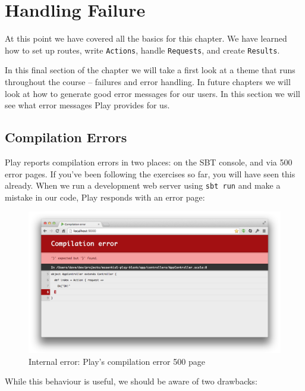 \documentclass[oneside,11pt,a4paper,]{book}
\begin{document}
\section{Handling Failure}\label{handling-failure}

At this point we have covered all the basics for this chapter. We have
learned how to set up routes, write \texttt{Actions}, handle
\texttt{Requests}, and create \texttt{Results}.

In this final section of the chapter we will take a first look at a
theme that runs throughout the course -- failures and error handling. In
future chapters we will look at how to generate good error messages for
our users. In this section we will see what error messages Play provides
for us.

\subsection{Compilation Errors}\label{compilation-errors}

Play reports compilation errors in two places: on the SBT console, and
via 500 error pages. If you've been following the exercises so far, you
will have seen this already. When we run a development web server using
\texttt{sbt run} and make a mistake in our code, Play responds with an
error page:

\begin{figure}[htbp]
\centering
\includegraphics{src/pages/basics/compile-error.png}
\caption{Internal error: Play's compilation error 500 page}
\end{figure}

While this behaviour is useful, we should be aware of two drawbacks:
\end{document}

